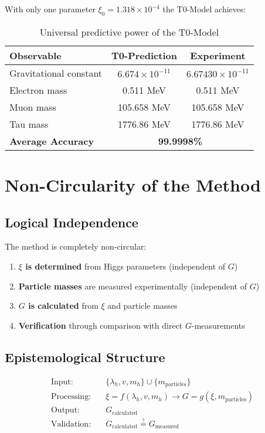 \documentclass[12pt,a4paper]{article}
\theoremstyle{definition}
\begin{document}
With only one parameter $\xi_0 = 1.318 \times 10^{-4}$ the T0-Model achieves:

\begin{table}[h]
	\centering
	\begin{tabular}{@{}lcc@{}}
		\toprule
		\textbf{Observable} & \textbf{T0-Prediction} & \textbf{Experiment} \\
		\midrule
		Gravitational constant & $6.674 \times 10^{-11}$ & $6.67430 \times 10^{-11}$ \\
		Electron mass & 0.511 MeV & 0.511 MeV \\
		Muon mass & 105.658 MeV & 105.658 MeV \\
		Tau mass & 1776.86 MeV & 1776.86 MeV \\
		\midrule
		\textbf{Average Accuracy} & \multicolumn{2}{c}{\textbf{99.9998\%}} \\
		\bottomrule
	\end{tabular}
	\caption{Universal predictive power of the T0-Model}
\end{table}

\section{Non-Circularity of the Method}

\subsection{Logical Independence}

The method is completely non-circular:

\begin{enumerate}
	\item \textbf{$\xi$ is determined} from Higgs parameters (independent of $G$)
	\item \textbf{Particle masses} are measured experimentally (independent of $G$)
	\item \textbf{$G$ is calculated} from $\xi$ and particle masses
	\item \textbf{Verification} through comparison with direct $G$-measurements
\end{enumerate}

\subsection{Epistemological Structure}

\begin{align}
	\text{Input:} \quad &\{\lambda_h, v, m_h\} \cup \{m_{\text{particles}}\}\\
	\text{Processing:} \quad &\xi = f(\lambda_h, v, m_h) \rightarrow G = g(\xi, m_{\text{particles}})\\
	\text{Output:} \quad &G_{\text{calculated}}\\
	\text{Validation:} \quad &G_{\text{calculated}} \stackrel{?}{=} G_{\text{measured}}
\end{align}
\end{document}
